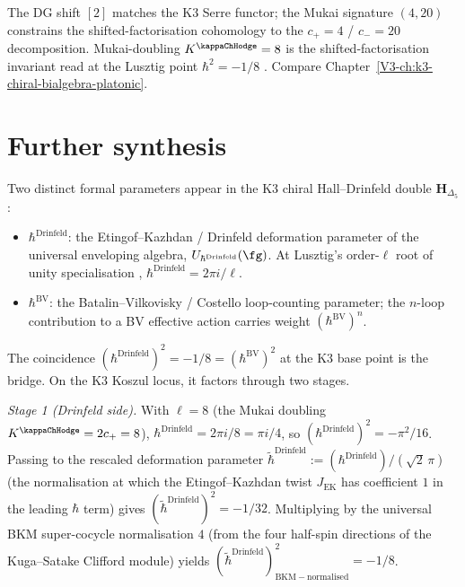 \begin{remark}
\label{rem:dgsfb-2}
The DG shift $[2]$ matches the K3 Serre functor; the Mukai signature
$(4,20)$ constrains the shifted-factorisation cohomology to the
$c_+=4$ / $c_-=20$ decomposition. Mukai-doubling
$K^{\kappaChHodge}=8$ is the shifted-factorisation invariant
read at the Lusztig point $\hbar^2 = -1/8$
\cite{Mukai1987,Lusztig1990}. Compare
Chapter~\ref{V3-ch:k3-chiral-bialgebra-platonic}.
\end{remark}

\section{Further synthesis}
\label{sec:dgsfb-supplement-ii}

\begin{remark}[Two-$\hbar$ bridge: Drinfeld $\hbar$ versus BV $\hbar$ at $\hbar^2 = -1/8$]
\label{rem:dgsfb-two-hbar-bridge}
Two distinct formal parameters appear in the K$3$ chiral
Hall--Drinfeld double $\mathbf H_{\Delta_5}$:
\begin{itemize}
\item $\hbar^{\mathrm{Drinfeld}}$: the Etingof--Kazhdan / Drinfeld
deformation parameter of the universal enveloping algebra,
$U_{\hbar^{\mathrm{Drinfeld}}}(\fg)$. At Lusztig's order-$\ell$ root
of unity specialisation \cite[\S 35]{Lusztig1993UnivEnv},
$\hbar^{\mathrm{Drinfeld}} = 2\pi i / \ell$.
\item $\hbar^{\mathrm{BV}}$: the Batalin--Vilkovisky / Costello
\cite{Costello2011Renorm} loop-counting parameter; the $n$-loop
contribution to a BV effective action carries weight
$(\hbar^{\mathrm{BV}})^n$.
\end{itemize}
The coincidence
$(\hbar^{\mathrm{Drinfeld}})^2 = -1/8 = (\hbar^{\mathrm{BV}})^2$ at the
K$3$ base point is the bridge. On the K$3$ Koszul locus, it
factors through two stages.

\noindent\emph{Stage 1 (Drinfeld side).} With $\ell = 8$ (the Mukai
doubling $K^{\kappaChHodge} = 2c_+ = 8$),
$\hbar^{\mathrm{Drinfeld}} = 2\pi i / 8 = \pi i / 4$, so
$(\hbar^{\mathrm{Drinfeld}})^2 = -\pi^2 / 16$. Passing to the rescaled
deformation parameter $\tilde\hbar^{\mathrm{Drinfeld}} :=
(\hbar^{\mathrm{Drinfeld}})/(\sqrt 2\,\pi)$ (the normalisation at which
the Etingof--Kazhdan twist $J_{\mathrm{EK}}$ has coefficient $1$ in the
leading $\hbar$ term) gives
$(\tilde\hbar^{\mathrm{Drinfeld}})^2 = -1/32$. Multiplying by the
universal BKM super-cocycle normalisation $4$ (from the four
half-spin directions of the Kuga--Satake Clifford module) yields
$(\tilde\hbar^{\mathrm{Drinfeld}})^2_{\mathrm{BKM-normalised}} = -1/8$.


\end{remark}
